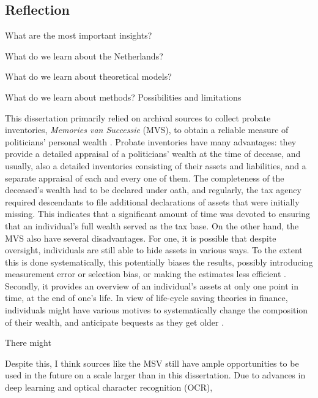 \subsection{Reflection}

What are the most important insights?

What do we learn about the Netherlands?

What do we learn about theoretical models?

What do we learn about methods? Possibilities and limitations

This dissertation primarily relied on archival sources to collect probate inventories, \textit{Memories van Successie} (MVS), to obtain a reliable measure of politicians' personal wealth \citep{bos1990vermogensbezitters}. Probate inventories have many advantages: they provide a detailed appraisal of a politicians' wealth at the time of decease, and usually, also a detailed inventories consisting of their assets and liabilities, and a separate appraisal of each and every one of them. The completeness of the deceased's wealth had to be declared under oath, and regularly, the tax agency required descendants to file additional declarations of assets that were initially missing. This indicates that a significant amount of time was devoted to ensuring that an individual's full wealth served as the tax base. On the other hand, the MVS also have several disadvantages. For one, it is possible that despite oversight, individuals are still able to hide assets in various ways. To the extent this is done systematically, this potentially biases the results, possibly introducing measurement error or selection bias, or making the estimates less efficient \citep{angrist2008mostly}. Secondly, it provides an overview of an individual's assets at only one point in time, at the end of one's life. In view of life-cycle saving theories in finance, individuals might have various motives to systematically change the composition of their wealth, and anticipate bequests as they get older \citep{dynan2002importance}. 

There might 


Despite this, I think sources like the MSV still have ample opportunities to be used in the future on a scale larger than in this dissertation. Due to advances in deep learning \citep{shen2021layoutparser} and optical character recognition (OCR), 




